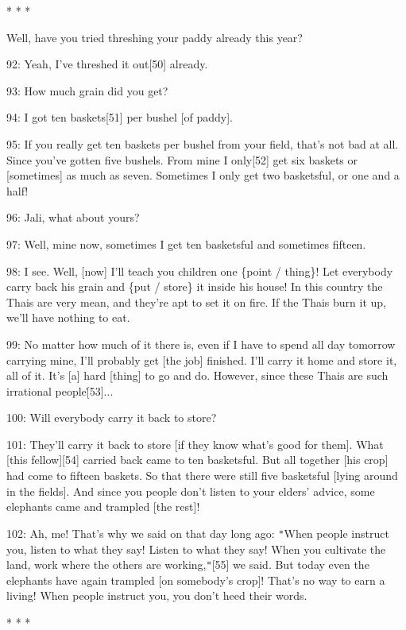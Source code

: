 \begin{center}
* * *
\end{center}

\leftskip=0pt
Well, have you tried threshing your paddy already this year?

92: Yeah, I've threshed it out[50] already.

93: How much grain did you get?

94: I got ten baskets[51] per bushel [of paddy].

95: If you really get ten baskets per bushel from your field, that's not bad at
all. Since you've gotten five bushels. From mine I only[52] get six baskets or
[sometimes] as much as seven. Sometimes I only get two basketsful, or one and a
half!

96: Jali, what about yours?

97: Well, mine now, sometimes I get ten basketsful and sometimes fifteen.

98: I see. Well, [now] I'll teach you children one \{point / thing\}! Let everybody
carry back his grain and \{put / store\} it inside his house! In this country the
Thais are very mean, and they're apt to set it on fire. If the Thais burn it up,
we'll have nothing to eat.

99: No matter how much of it there is, even if I have to spend all day tomorrow
carrying mine, I'll probably get [the job] finished. I'll carry it home and store
it, all of it. It's [a] hard [thing] to go and do. However, since these Thais are
such irrational people\.[53]...

100: Will everybody carry it back to store?

101: They'll carry it back to store [if they know what's good for them]. What [this
fellow][54] carried back came to ten basketsful. But all together [his crop] had
come to fifteen baskets. So that there were still five basketsful [lying around
in the fields]. And since you people don't listen to your elders' advice, some
elephants came and trampled [the rest]!

102: Ah, me! That's why we said on that day long ago: \texttt{"}When people instruct
you, listen to what they say! Listen to what they say! When you cultivate the land,
work where the others are working,\texttt{"}[55] we said. But today even the elephants
have again trampled [on somebody's crop]! That's no way to earn a living! When
people instruct you, you don't heed their words.

\begin{center}
* * *
\end{center}

